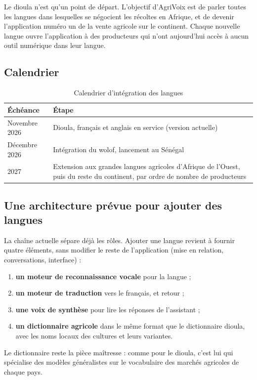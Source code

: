 \documentclass[12pt,a4paper]{article}
\begin{document}
Le dioula n'est qu'un point de départ. L'objectif d'AgriVoix est de parler toutes les langues
dans lesquelles se négocient les récoltes en Afrique, et de devenir l'application numéro un de la
vente agricole sur le continent. Chaque nouvelle langue ouvre l'application à des producteurs qui
n'ont aujourd'hui accès à aucun outil numérique dans leur langue.

\subsection{Calendrier}

\begin{table}[h]
\centering
\begin{tabularx}{\textwidth}{lL}
\toprule
Échéance & Étape \\
\midrule
Novembre 2026 & Dioula, français et anglais en service (version actuelle) \\
Décembre 2026 & Intégration du wolof, lancement au Sénégal \\
2027 & Extension aux grandes langues agricoles d'Afrique de l'Ouest, puis du reste du continent, par ordre de nombre de producteurs \\
\bottomrule
\end{tabularx}
\caption{Calendrier d'intégration des langues}
\end{table}

\subsection{Une architecture prévue pour ajouter des langues}

La chaîne actuelle sépare déjà les rôles. Ajouter une langue revient à fournir quatre éléments,
sans modifier le reste de l'application (mise en relation, conversations, interface) :
\begin{enumerate}
  \item \textbf{un moteur de reconnaissance vocale} pour la langue ;
  \item \textbf{un moteur de traduction} vers le français, et retour ;
  \item \textbf{une voix de synthèse} pour lire les réponses de l'assistant ;
  \item \textbf{un dictionnaire agricole} dans le même format que le dictionnaire dioula, avec les
  noms locaux des cultures et leurs variantes.
\end{enumerate}
Le dictionnaire reste la pièce maîtresse : comme pour le dioula, c'est lui qui spécialise des
modèles généralistes sur le vocabulaire des marchés agricoles de chaque pays.
\end{document}
